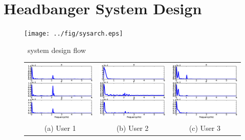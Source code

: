 \section{Headbanger System Design}\label{sec:design}

\begin{figure}[t]
\centering
\texttt{[image: ../fig/sysarch.eps]}
\caption{\systemname~system design flow}
\label{fig:sysarch}
\end{figure}

\begin{figure}[t]
\begin{center}
\begin{tabular}{ccc}
\includegraphics [width=.33\linewidth]{../fig/freq_sub1}&
\includegraphics [width=.33\linewidth]{../fig/freq_sub8}&
\includegraphics [width=.33\linewidth]{../fig/freq_sub9}\\
(a) User 1& (b) User 2 & (c) User 3 \\
\end{tabular}


\end{center}
\end{figure}
